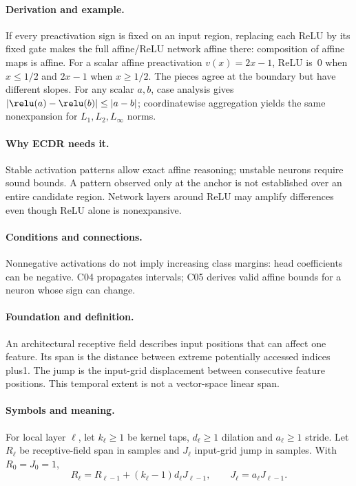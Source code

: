 \paragraph{Derivation and example.}
If every preactivation sign is fixed on an input region, replacing each
ReLU by its fixed gate makes the full affine/ReLU network affine there:
composition of affine maps is affine. For a scalar affine preactivation
$v(x)=2x-1$, ReLU is~0 when $x\le1/2$ and $2x-1$ when $x\ge1/2$.
The pieces agree at the boundary but have different slopes.
For any scalar $a,b$, case analysis gives
$|\relu(a)-\relu(b)|\le|a-b|$; coordinatewise aggregation yields the
same nonexpansion for $L_1,L_2,L_\infty$ norms.
\paragraph{Why ECDR needs it.}
Stable activation patterns allow exact affine reasoning; unstable neurons
require sound bounds. A pattern observed only at the anchor is not
established over an entire candidate region. Network layers around ReLU
may amplify differences even though ReLU alone is nonexpansive.
\paragraph{Conditions and connections.}
Nonnegative activations do not imply increasing class margins: head
coefficients can be negative. C04 propagates intervals; C05 derives valid
affine bounds for a neuron whose sign can change.

\paragraph{Foundation and definition.}
An architectural receptive field describes input positions that can affect
one feature. Its span is the distance between extreme potentially accessed
indices plus1. The jump is the input-grid displacement between consecutive
feature positions. This temporal extent is not a vector-space linear span.
\paragraph{Symbols and meaning.}
For local layer $\ell$, let $k_\ell\ge1$ be kernel taps, $d_\ell\ge1$
dilation and $a_\ell\ge1$ stride. Let $R_\ell$ be receptive-field span
in samples and $J_\ell$ input-grid jump in samples. With
$R_0=J_0=1$,
\[
 R_\ell=R_{\ell-1}+(k_\ell-1)d_\ell J_{\ell-1},\qquad
 J_\ell=a_\ell J_{\ell-1}.
\]
